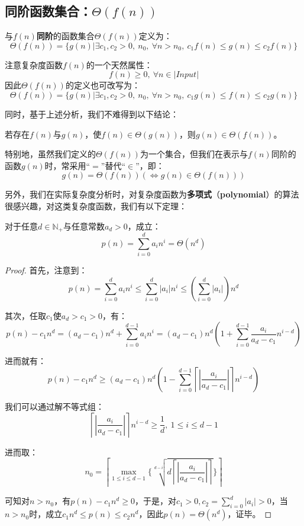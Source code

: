 \documentclass[12pt,a4paper,violet]{bbe}
\begin{document}
\subsection{同阶函数集合：$\Theta(f(n))$}
\begin{definition}
	与$f(n)$\textbf{同阶}的函数集合$\Theta(f(n))$定义为：
	$$
	\Theta(f(n))=\{g(n)|\exists c_1,c_2>0,~n_0,~\forall n>n_0,~c_1f(n)\leqslant g(n)\leqslant c_2f(n)\}
	$$
\end{definition}
\begin{remark}
	注意复杂度函数$f(n)$的一个天然属性：
	$$
	f(n)\geqslant 0,~\forall n\in |Input|
	$$
	因此$\Theta(f(n))$的定义也可改写为：
		$$
	\Theta(f(n))=\{g(n)|\exists c_1,c_2>0,~n_0,~\forall n>n_0,~c_1g(n)\leqslant f(n)\leqslant c_2g(n)\}
	$$
\end{remark}
同时，基于上述分析，我们不难得到以下结论：
\begin{theorem}
	若存在$f(n)$与$g(n)$，使$f(n)\in\Theta(g(n))$，则$g(n)\in\Theta(f(n))$。
\end{theorem}

特别地，虽然我们定义的$\Theta(f(n))$为一个集合，但我们在表示与$f(n)$同阶的函数$g(n)$时，常采用“$=$”替代“$\in$”，即：
$$
g(n)=\Theta(f(n))(\Leftrightarrow g(n)\in\Theta(f(n)))
$$

另外，我们在实际复杂度分析时，对复杂度函数为\textbf{多项式}（\textbf{polynomial}）的算法很感兴趣，对这类复杂度函数，我们有以下定理：
\begin{theorem}
对于任意$d\in\mathbb{N}_+$与任意常数$a_d>0$，成立：
$$
p(n)=\sum\limits_{i=0}^{d}a_in^i=\Theta(n^d)
$$
\end{theorem}
\begin{proof}
	首先，注意到：
	$$
	p(n)=\sum\limits_{i=0}^{d}a_in^i\leqslant\sum\limits_{i=0}^{d}|a_i|n^i\leqslant(\sum\limits_{i=0}^{d}|a_i|)n^d
	$$
	
	其次，任取$c_1$使$a_d>c_1>0$，有：
	$$
	p(n)-c_1n^d=(a_d-c_1)n^d+\sum\limits_{i=0}^{d-1}a_in^i=(a_d-c_1)n^d(1+\sum\limits_{i=0}^{d-1}\frac{a_i}{a_d-c_1}n^{i-d})
	$$
	
	进而就有：
	$$
	p(n)-c_1n^d\geqslant(a_d-c_1)n^d(1-\sum\limits_{i=0}^{d-1}\left\lceil\left|\frac{a_i}{a_d-c_1}\right|\right\rceil n^{i-d})
	$$
	
	我们可以通过解不等式组：
	$$
	\left\lceil\left|\frac{a_i}{a_d-c_1}\right|\right\rceil n^{i-d}\geqslant\frac{1}{d},~1\leqslant i\leqslant d-1
	$$
	
	进而取：
	$$
	n_0=\left\lceil\max\limits_{1\leqslant i\leqslant d-1}\{\sqrt[d-i]{\displaystyle d\left\lceil\left|\frac{a_i}{a_d-c_1}\right|\right\rceil}\}\right\rceil
	$$
	
	可知对$n>n_0$，有$p(n)-c_1n^d\geqslant 0$，于是，对$c_1>0,c_2=\displaystyle \sum\limits_{i=0}^{d}|a_i|>0$，当$n>n_0$时，成立$c_1n^d\leqslant p(n)\leqslant c_2n^d$，因此$p(n)=\Theta(n^d)$，证毕。
\end{proof}
\end{document}
